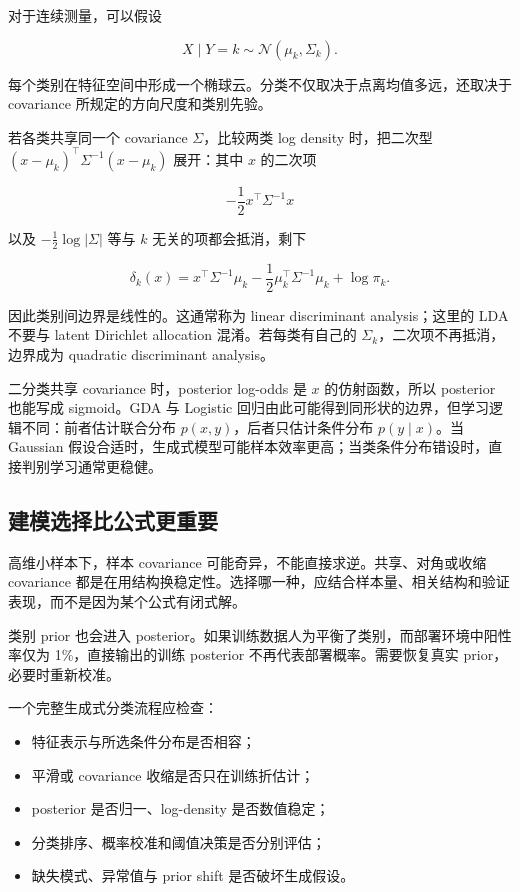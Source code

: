 对于连续测量，可以假设

\[
X\mid Y=k\sim\mathcal N(\mu_k,\Sigma_k).
\]

每个类别在特征空间中形成一个椭球云。分类不仅取决于点离均值多远，还取决于 covariance 所规定的方向尺度和类别先验。

若各类共享同一个 covariance \(\Sigma\)，比较两类 log density 时，把二次型 \((x-\mu_k)^\top\Sigma^{-1}(x-\mu_k)\) 展开：其中 \(x\) 的二次项

\[
-\frac12x^\top\Sigma^{-1}x
\]

以及 \(-\frac12\log|\Sigma|\) 等与 \(k\) 无关的项都会抵消，剩下

\[
\delta_k(x)
=x^\top\Sigma^{-1}\mu_k
-\frac12\mu_k^\top\Sigma^{-1}\mu_k
+\log\pi_k.
\]

因此类别间边界是线性的。这通常称为 linear discriminant analysis；这里的 LDA 不要与 latent Dirichlet allocation 混淆。若每类有自己的 \(\Sigma_k\)，二次项不再抵消，边界成为 quadratic discriminant analysis。

二分类共享 covariance 时，posterior log-odds 是 \(x\) 的仿射函数，所以 posterior 也能写成 sigmoid。GDA 与 Logistic 回归由此可能得到同形状的边界，但学习逻辑不同：前者估计联合分布 \(p(x,y)\)，后者只估计条件分布 \(p(y\mid x)\)。当 Gaussian 假设合适时，生成式模型可能样本效率更高；当类条件分布错设时，直接判别学习通常更稳健。

\subsection{建模选择比公式更重要}

高维小样本下，样本 covariance 可能奇异，不能直接求逆。共享、对角或收缩 covariance 都是在用结构换稳定性。选择哪一种，应结合样本量、相关结构和验证表现，而不是因为某个公式有闭式解。

类别 prior 也会进入 posterior。如果训练数据人为平衡了类别，而部署环境中阳性率仅为 1\%，直接输出的训练 posterior 不再代表部署概率。需要恢复真实 prior，必要时重新校准。

一个完整生成式分类流程应检查：

\begin{itemize}
\tightlist
\item
  特征表示与所选条件分布是否相容；
\item
  平滑或 covariance 收缩是否只在训练折估计；
\item
  posterior 是否归一、log-density 是否数值稳定；
\item
  分类排序、概率校准和阈值决策是否分别评估；
\item
  缺失模式、异常值与 prior shift 是否破坏生成假设。
\end{itemize}
